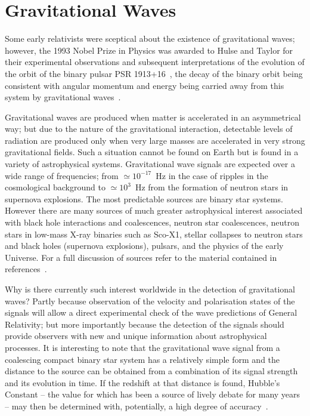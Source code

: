 \documentclass{article}
\begin{document}

\newpage

\section{Gravitational Waves}
\label{section:gravwaves}

Some early relativists were sceptical about the existence of gravitational
waves; however, the 1993 Nobel Prize in Physics was awarded to Hulse and Taylor
for their experimental observations and subsequent interpretations of the
evolution of the orbit of the binary pulsar PSR 1913+16~\cite{Hulse, Taylor},
the decay of the binary orbit being consistent with angular momentum and energy
being carried away from this system by gravitational waves~\cite{Will}.
        
Gravitational waves are produced when matter is accelerated in an asymmetrical
way; but due to the nature of the gravitational interaction, detectable levels
of radiation are produced only when very large masses are accelerated in very
strong gravitational fields. Such a situation cannot be found on Earth but is
found in a variety of astrophysical systems. Gravitational wave signals are
expected over a wide range of frequencies; from $\simeq 10^{-17}$~Hz in the case
of ripples in the cosmological background to $\simeq 10^3$~Hz from the formation
of neutron stars in supernova explosions. The most predictable sources are
binary star systems. However there are many sources of much greater
astrophysical interest associated with black hole interactions and coalescences,
neutron star coalescences, neutron stars in low-mass X-ray binaries such as
Sco-X1, stellar collapses to neutron stars and black holes (supernova
explosions), pulsars, and the physics of the early Universe. For a full
discussion of sources refer to the material contained in
references~\cite{LISAsymposium, sources, Amaldiproc}.
        
Why is there currently such interest worldwide in the detection of gravitational
waves? Partly because observation of the velocity and polarisation states of the
signals will allow a direct experimental check of the wave predictions of
General Relativity; but more importantly because the detection of the signals
should provide observers with new and unique information about astrophysical
processes. It is interesting to note that the gravitational wave signal from a
coalescing compact binary star system has a relatively simple form and the
distance to the source can be obtained from a combination of its signal strength
and its evolution in time. If the redshift at that distance is found, Hubble's
Constant -- the value for which has been a source of lively debate for many
years -- may then be determined with, potentially, a high degree of
accuracy~\cite{Schutz}.
\end{document}
